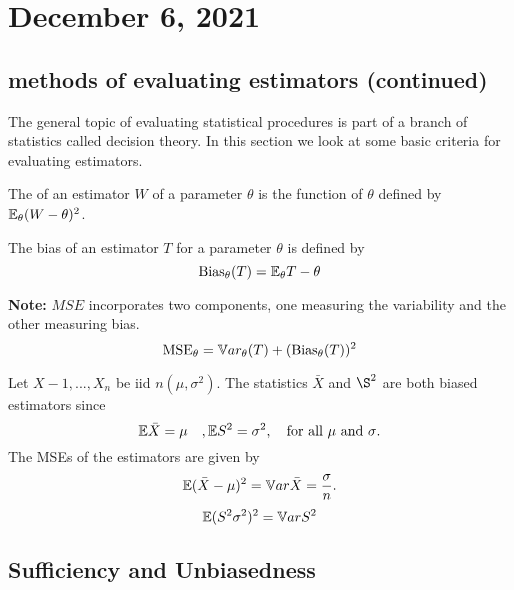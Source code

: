 \section{December 6, 2021}
\subsection{methods of evaluating estimators (continued)}
The general topic of evaluating statistical procedures is part of a branch of statistics called decision theory. In this section we look at some basic criteria for evaluating estimators.
    
\begin{definition}
    The  of an estimator $W$ of a parameter $\theta$ is the function of $\theta$ defined by $\mathbb E_{\theta}(W-\theta)^2$.
\end{definition}

\begin{definition}[Bias]
    The bias of an estimator $T$ for a parameter $\theta$ is defined by 
    $$
    \text{Bias}_{\theta}(T) = \mathbb E_{\theta}T -\theta
    $$
\end{definition}
\textbf{Note:} $MSE$ incorporates two components, one measuring the variability and the other measuring bias.
$$
\text{MSE}_{\theta} = \mathbb V ar_{\theta}(T) + (\text{Bias}_{\theta}(T))^2
$$
\begin{example}
    Let $X-1,...,X_n$ be iid $n(\mu,\sigma^2)$. The statistics $\bar{X}$ and $\S^2$ are both biased estimators since
    $$
    \mathbb E \bar{X} = \mu \quad, \mathbb E S^2 = \sigma^2, \quad \text{for all $\mu$ and $\sigma$}.
    $$
    The MSEs of the estimators are given by
    $$
    \mathbb E(\bar{X} - \mu)^2 = \mathbb V ar \bar{X} = \frac{\sigma}{n}.
    $$
    $$
    \mathbb E(S^2 \sigma^2)^2 = \mathbb V ar S^2
    $$
\end{example}
\subsection{Sufficiency and Unbiasedness}